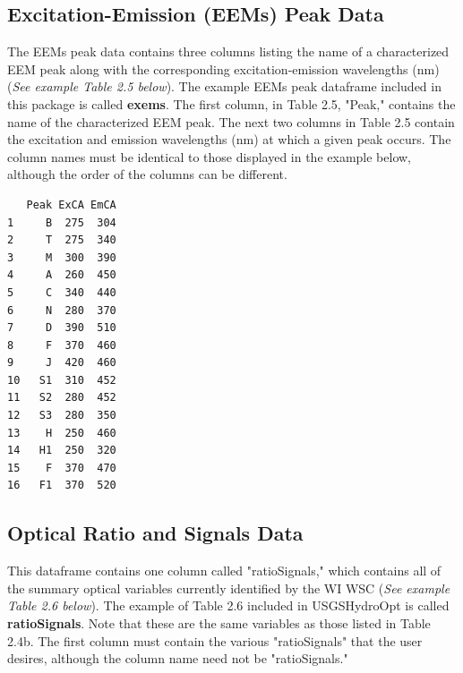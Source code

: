 \documentclass[a4paper,11pt]{article}\usepackage[]{graphicx}\usepackage[]{color}
\makeatletter
\newenvironment{kframe}{%
 \def\at@end@of@kframe{}%
 \ifinner\ifhmode%
  \def\at@end@of@kframe{\end{minipage}}%
  \begin{minipage}{\columnwidth}%
 \fi\fi%
 \def\FrameCommand##1{\hskip\@totalleftmargin \hskip-\fboxsep
 \colorbox{shadecolor}{##1}\hskip-\fboxsep
     \hskip-\linewidth \hskip-\@totalleftmargin \hskip\columnwidth}%
 \MakeFramed {\advance\hsize-\width
   \@totalleftmargin\z@ \linewidth\hsize
   \@setminipage}}%
 {\par\unskip\endMakeFramed%
 \at@end@of@kframe}
\newenvironment{knitrout}{}{} %
\makeatother
\begin{document}
\subsection{Excitation-Emission (EEMs) Peak Data}
The EEMs peak data contains three columns listing the name of a characterized EEM peak along with the corresponding excitation-emission wavelengths (nm) (\emph{See example Table 2.5 below}). The example EEMs peak dataframe included in this package is called \textbf{ex\textunderscore ems}. The first column, in Table 2.5, "Peak," contains the name of the characterized EEM peak. The next two columns in Table 2.5 contain the excitation and emission wavelengths (nm) at which a given peak occurs. The column names must be identical to those displayed in the example below, although the order of the columns can be different. 

\begin{knitrout}
\color{fgcolor}\begin{kframe}
\begin{verbatim}
   Peak ExCA EmCA
1     B  275  304
2     T  275  340
3     M  300  390
4     A  260  450
5     C  340  440
6     N  280  370
7     D  390  510
8     F  370  460
9     J  420  460
10   S1  310  452
11   S2  280  452
12   S3  280  350
13    H  250  460
14   H1  250  320
15    F  370  470
16   F1  370  520
\end{verbatim}
\end{kframe}
\end{knitrout}

\subsection{Optical Ratio and Signals Data}
This dataframe contains one column called "ratioSignals," which contains all of the summary optical variables currently identified by the WI WSC (\emph{See example Table 2.6 below}). The example of Table 2.6 included in  USGSHydroOpt is called \textbf{ratioSignals}.  Note that these are the same variables as those listed in Table 2.4b. The first column must contain the various "ratioSignals" that the user desires, although the column name need not be "ratioSignals."
\end{document}
